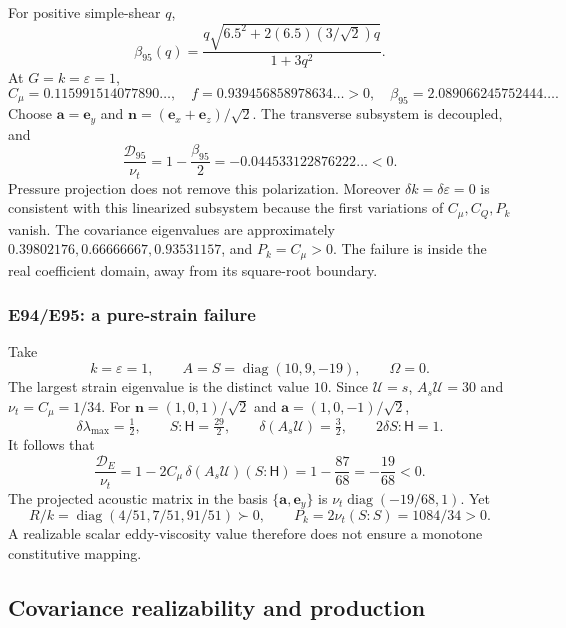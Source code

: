 \documentclass[11pt,a4paper]{article}
\numberwithin{equation}{section}
\newcommand{\eps}{\varepsilon}
\newcommand{\nut}{\nu_t}
\DeclareMathOperator{\diag}{diag}
\begin{document}
For positive simple-shear $q$,
\begin{equation}
 \beta_{95}(q)
 =\frac{q\sqrt{6.5^2+2(6.5)(3/\sqrt2)q}}{1+3q^2}.
 \label{st:a95-beta-q}
\end{equation}
At $G=k=\eps=1$,
\[
 C_\mu=0.115991514077890\ldots,\quad
 f=0.939456858978634\ldots>0,\quad
 \beta_{95}=2.089066245752444\ldots .
\]
Choose $\boldsymbol a=\boldsymbol e_y$ and
$\boldsymbol n=(\boldsymbol e_x+\boldsymbol e_z)/\sqrt2$.
The transverse subsystem is decoupled, and
\begin{equation}
 \boxed{\frac{\mathcal D_{95}}{\nut}
       =1-\frac{\beta_{95}}2
       =-0.044533122876222\ldots<0.}
 \label{st:a95-negative}
\end{equation}
Pressure projection does not remove this polarization.
Moreover $\delta k=\delta\eps=0$ is consistent with this linearized
subsystem because the first variations of $C_\mu,C_Q,P_k$ vanish.
The covariance eigenvalues are approximately
$0.39802176,0.66666667,0.93531157$, and $P_k=C_\mu>0$.
The failure is inside the real coefficient domain, away from its
square-root boundary.

\subsubsection{E94/E95: a pure-strain failure}

Take
\[
 k=\eps=1,\qquad A=S=\diag(10,9,-19),\qquad\Omega=0.
\]
The largest strain eigenvalue is the distinct value $10$.
Since $\mathcal U=s$,
$A_s\mathcal U=30$ and $\nut=C_\mu=1/34$.
For
$\boldsymbol n=(1,0,1)/\sqrt2$ and
$\boldsymbol a=(1,0,-1)/\sqrt2$,
\[
 \delta\lambda_{\max}=\tfrac12,\qquad
 S:\mathsf H=\tfrac{29}{2},\qquad
 \delta(A_s\mathcal U)=\tfrac32,\qquad
 2\delta S:\mathsf H=1.
\]
It follows that
\begin{equation}
 \boxed{\frac{\mathcal D_E}{\nut}
 =1-2C_\mu\,\delta(A_s\mathcal U)(S:\mathsf H)
 =1-\frac{87}{68}=-\frac{19}{68}<0.}
 \label{st:e-negative}
\end{equation}
The projected acoustic matrix in the basis
$\{\boldsymbol a,\boldsymbol e_y\}$ is
$\nut\diag(-19/68,1)$. Yet
\begin{equation}
 \boxed{R/k=\diag(4/51,7/51,91/51)\succ0,\qquad
        P_k=2\nut(S:S)=1084/34>0.}
 \label{st:e-failure-covariance}
\end{equation}
A realizable scalar eddy-viscosity value therefore does not ensure
a monotone constitutive mapping.

\subsection{Covariance realizability and production}
\label{st:realizability}
\end{document}
